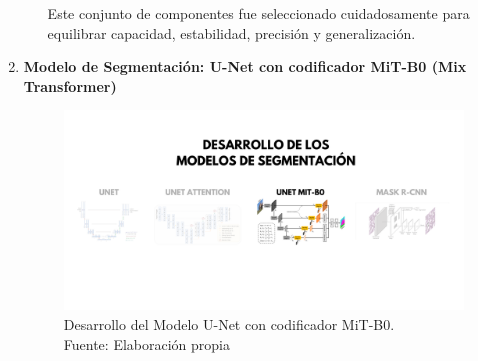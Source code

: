 \begin{enumerate}
\begin{itemize}
Este conjunto de componentes fue seleccionado cuidadosamente para equilibrar capacidad, estabilidad, precisión y generalización.

  \end{itemize}
  \newpage
  \item \textbf{Modelo de Segmentación: U-Net con codificador MiT-B0 (Mix Transformer)}
  \begin{figure}[H]
	\begin{center}
		\includegraphics[width=1\textwidth]{4/figures/desunetmit.png}
		\caption[Desarrollo del Modelo U-Net con codificador MiT-B0]{Desarrollo del Modelo U-Net con codificador MiT-B0.\\
		Fuente: Elaboración propia}
		\label{4:figdesunetmit}
	\end{center}
\end{figure}
  \begin{itemize}


\end{itemize}
\end{enumerate}
